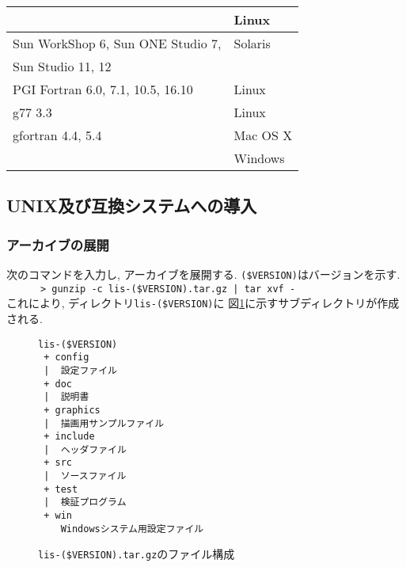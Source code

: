 \documentclass[a4paper]{jarticle}
\begin{document}
\begin{table}[htbp]
\begin{center}
{\begin{tabular}{l|l}
                                           & Linux   \\
\hline
Sun WorkShop 6, Sun ONE Studio 7,          & Solaris \\
Sun Studio 11, 12                          &         \\
\hline
PGI Fortran 6.0, 7.1, 10.5, 16.10          & Linux \\
\hline
g77 3.3                                    & Linux \\
gfortran 4.4, 5.4                          & Mac OS X \\
                                           & Windows \\
\hline
\end{tabular}
}
\end{center}
\end{table} 

\subsection{UNIX及び互換システムへの導入}
\subsubsection{アーカイブの展開}
次のコマンドを入力し, アーカイブを展開する. \verb|($VERSION)|はバージョンを示す. \\
\verb&      > gunzip -c lis-($VERSION).tar.gz | tar xvf - &\\
これにより, ディレクトリ{\tt lis-(\$VERSION)}に
図\ref{listargz}に示すサブディレクトリが作成される. 

\begin{figure}[htbp]
\begin{center}
\begin{verbatim}
lis-($VERSION)
 + config
 |  設定ファイル
 + doc
 |  説明書
 + graphics
 |  描画用サンプルファイル
 + include
 |  ヘッダファイル
 + src
 |  ソースファイル
 + test
 |  検証プログラム
 + win
    Windowsシステム用設定ファイル
\end{verbatim}
\end{center}
\caption{{\tt lis-(\$VERSION).tar.gz}のファイル構成}
\label{listargz}
\end{figure}
\end{document}
